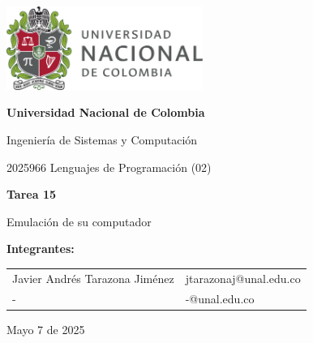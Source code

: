 \documentclass{article}
\begin{document}
\begin{titlepage}
    \centering
    \includegraphics[width=0.48\textwidth]{logo_universidad.png}
    \par\vspace{2cm}

    {\Large \textbf{Universidad Nacional de Colombia} \par}
    \vspace{0.5cm}
    {\large Ingeniería de Sistemas y Computación \par}
    {\large 2025966 Lenguajes de Programación (02)\par}
    \vspace{3cm}

    {\large \textbf{Tarea 15} \par}
    {\large Emulación de su computador\par}
    \vspace{3cm}

    {\large \textbf{Integrantes:} \par}
    \vspace{0.5cm}
    \begin{tabular}{ll}
    Javier Andrés Tarazona Jiménez & jtarazonaj@unal.edu.co \\
    - & -@unal.edu.co \\
    \end{tabular}
    \par\vspace{3cm}

    {\large Mayo 7 de 2025 \par}
\end{titlepage}

\tableofcontents %

\newpage %


\end{document}
